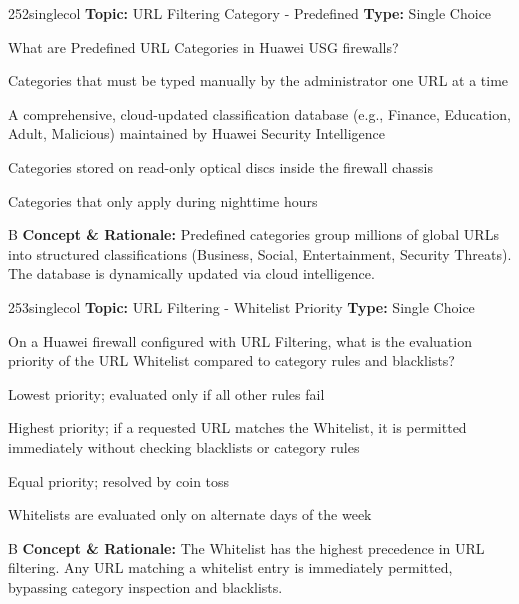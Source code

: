 \begin{qcard}{252}{singlecol}
\textcolor{darkslate!75}{\small\textbf{Topic:} URL Filtering Category - Predefined \hfill \textbf{Type:} Single Choice}\vspace{0.4em}\par
What are Predefined URL Categories in Huawei USG firewalls?
\begin{qoptions}
\item Categories that must be typed manually by the administrator one URL at a time
\item A comprehensive, cloud-updated classification database (e.g., Finance, Education, Adult, Malicious) maintained by Huawei Security Intelligence
\item Categories stored on read-only optical discs inside the firewall chassis
\item Categories that only apply during nighttime hours
\end{qoptions}
\end{qcard}
\nopagebreak
\begin{explainbox}{B}
\textbf{Concept \& Rationale:} Predefined categories group millions of global URLs into structured classifications (Business, Social, Entertainment, Security Threats). The database is dynamically updated via cloud intelligence.
\end{explainbox}

\begin{qcard}{253}{singlecol}
\textcolor{darkslate!75}{\small\textbf{Topic:} URL Filtering - Whitelist Priority \hfill \textbf{Type:} Single Choice}\vspace{0.4em}\par
On a Huawei firewall configured with URL Filtering, what is the evaluation priority of the URL Whitelist compared to category rules and blacklists?
\begin{qoptions}
\item Lowest priority; evaluated only if all other rules fail
\item Highest priority; if a requested URL matches the Whitelist, it is permitted immediately without checking blacklists or category rules
\item Equal priority; resolved by coin toss
\item Whitelists are evaluated only on alternate days of the week
\end{qoptions}
\end{qcard}
\nopagebreak
\begin{explainbox}{B}
\textbf{Concept \& Rationale:} The Whitelist has the highest precedence in URL filtering. Any URL matching a whitelist entry is immediately permitted, bypassing category inspection and blacklists.
\end{explainbox}

